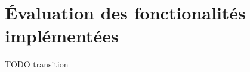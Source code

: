 \section{Évaluation des fonctionalités implémentées}
\label{section:evaluation}
{\color{red} TODO transition}

